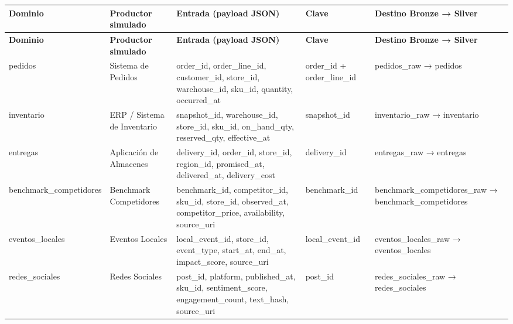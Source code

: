 \documentclass[11pt]{article}
\begin{document}
\begingroup\small
\begin{longtable}{@{}>{\raggedright\arraybackslash}p{}>{\raggedright\arraybackslash}p{}>{\raggedright\arraybackslash}p{}>{\raggedright\arraybackslash}p{}>{\raggedright\arraybackslash}p{}@{}}
\toprule
\textbf{Dominio} & \textbf{Productor simulado} & \textbf{Entrada (payload JSON)} & \textbf{Clave} & \textbf{Destino Bronze → Silver} \\
\midrule
\endfirsthead
\toprule
\textbf{Dominio} & \textbf{Productor simulado} & \textbf{Entrada (payload JSON)} & \textbf{Clave} & \textbf{Destino Bronze → Silver} \\
\midrule
\endhead
pedidos & Sistema de Pedidos & order\_\allowbreak{}id, order\_\allowbreak{}line\_\allowbreak{}id, customer\_\allowbreak{}id, store\_\allowbreak{}id, warehouse\_\allowbreak{}id, sku\_\allowbreak{}id, quantity, occurred\_\allowbreak{}at & order\_\allowbreak{}id + order\_\allowbreak{}line\_\allowbreak{}id & pedidos\_\allowbreak{}raw → pedidos \\
inventario & ERP / Sistema de Inventario & snapshot\_\allowbreak{}id, warehouse\_\allowbreak{}id, store\_\allowbreak{}id, sku\_\allowbreak{}id, on\_\allowbreak{}hand\_\allowbreak{}qty, reserved\_\allowbreak{}qty, effective\_\allowbreak{}at & snapshot\_\allowbreak{}id & inventario\_\allowbreak{}raw → inventario \\
entregas & Aplicación de Almacenes & delivery\_\allowbreak{}id, order\_\allowbreak{}id, store\_\allowbreak{}id, region\_\allowbreak{}id, promised\_\allowbreak{}at, delivered\_\allowbreak{}at, delivery\_\allowbreak{}cost & delivery\_\allowbreak{}id & entregas\_\allowbreak{}raw → entregas \\
benchmark\_\allowbreak{}competidores & Benchmark Competidores & benchmark\_\allowbreak{}id, competitor\_\allowbreak{}id, sku\_\allowbreak{}id, store\_\allowbreak{}id, observed\_\allowbreak{}at, competitor\_\allowbreak{}price, availability, source\_\allowbreak{}uri & benchmark\_\allowbreak{}id & benchmark\_\allowbreak{}competidores\_\allowbreak{}raw → benchmark\_\allowbreak{}competidores \\
eventos\_\allowbreak{}locales & Eventos Locales & local\_\allowbreak{}event\_\allowbreak{}id, store\_\allowbreak{}id, event\_\allowbreak{}type, start\_\allowbreak{}at, end\_\allowbreak{}at, impact\_\allowbreak{}score, source\_\allowbreak{}uri & local\_\allowbreak{}event\_\allowbreak{}id & eventos\_\allowbreak{}locales\_\allowbreak{}raw → eventos\_\allowbreak{}locales \\
redes\_\allowbreak{}sociales & Redes Sociales & post\_\allowbreak{}id, platform, published\_\allowbreak{}at, sku\_\allowbreak{}id, sentiment\_\allowbreak{}score, engagement\_\allowbreak{}count, text\_\allowbreak{}hash, source\_\allowbreak{}uri & post\_\allowbreak{}id & redes\_\allowbreak{}sociales\_\allowbreak{}raw → redes\_\allowbreak{}sociales \\
\bottomrule
\end{longtable}
\endgroup
\end{document}

